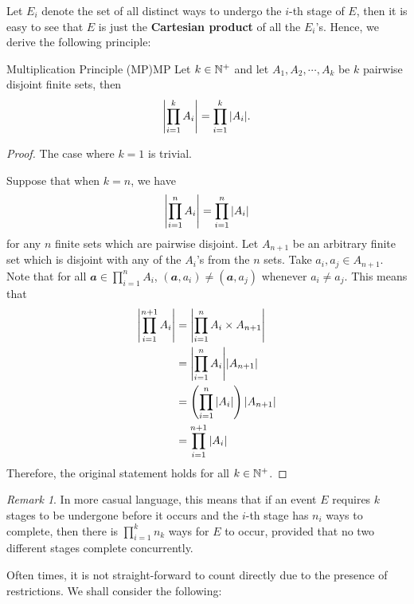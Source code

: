 \documentclass[math]{amznotes}
\theoremstyle{remark}
\newtheorem*{remark}{Remark}
\begin{document}
Let $E_i$ denote the set of all distinct ways to undergo the $i$-th stage of $E$, then it is easy to see that $E$ is just the {\color{red} \textbf{Cartesian product}} of all the $E_i$'s. Hence, we derive the following principle:
\begin{thmbox}{Multiplication Principle (MP)}{MP}
    Let $k \in \mathbb{N}^+$ and let $A_1, A_2, \cdots, A_k$ be $k$ pairwise disjoint finite sets, then
    \begin{equation*}
        {\left\lvert {\prod_{i = 1}^{k}A_i} \right\rvert} = \prod_{i = 1}^{k}{\left\lvert {A_i} \right\rvert}.
    \end{equation*}
    \tcblower
    \begin{proof}
        The case where $k = 1$ is trivial.

        Suppose that when $k = n$, we have
        \begin{equation*}
            {\left\lvert {\prod_{i = 1}^{n}A_i} \right\rvert} = \prod_{i = 1}^{n}{\left\lvert {A_i} \right\rvert}
        \end{equation*} 
        for any $n$ finite sets which are pairwise disjoint. Let $A_{n + 1}$ be an arbitrary finite set which is disjoint with any of the $A_i$'s from the $n$ sets. Take $a_i, a_j \in A_{n + 1}$. Note that for all $\mathbfit{a} \in \prod_{i = 1}^{n}A_i$, $(\mathbfit{a}, a_i) \neq (\mathbfit{a}, a_j)$ whenever $a_i \neq a_j$. This means that
        \begin{align*}
            {\left\lvert {\prod_{i = 1}^{n + 1}A_i} \right\rvert} & = {\left\lvert {\prod_{i = 1}^{n}A_i \times A_{n + 1}} \right\rvert} \\
            & = {\left\lvert {\prod_{i = 1}^{n}A_i} \right\rvert}{\left\lvert {A_{n + 1}} \right\rvert} \\
            & = \left(\prod_{i = 1}^{n}{\left\lvert {A_i} \right\rvert}\right){\left\lvert {A_{n + 1}} \right\rvert} \\
            & = \prod_{i = 1}^{n + 1}{\left\lvert {A_i} \right\rvert}
        \end{align*}
        Therefore, the original statement holds for all $k \in \mathbb{N}^+$.
    \end{proof}
\end{thmbox}
\begin{notebox}
    \begin{remark}
        In more casual language, this means that if an event $E$ requires $k$ stages to be undergone before it occurs and the $i$-th stage has $n_i$ ways to complete, then there is $\prod_{i = 1}^{k}n_k$ ways for $E$ to occur, provided that no two different stages complete concurrently.
    \end{remark}
\end{notebox}
Often times, it is not straight-forward to count directly due to the presence of restrictions. We shall consider the following:
\end{document}
